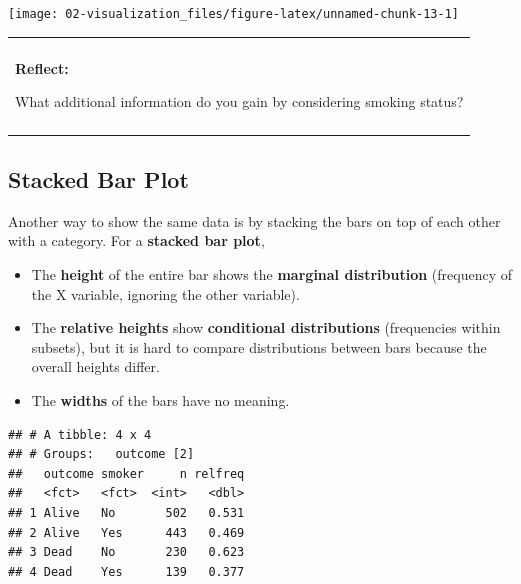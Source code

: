 \documentclass[
]{book}
\newenvironment{Shaded}{\begin{snugshade}}{\end{snugshade}}
\newcommand{\CommentTok}[1]{\textcolor[rgb]{0.56,0.35,0.01}{\textit{#1}}}
\newcommand{\DataTypeTok}[1]{\textcolor[rgb]{0.13,0.29,0.53}{#1}}
\newcommand{\KeywordTok}[1]{\textcolor[rgb]{0.13,0.29,0.53}{\textbf{#1}}}
\newcommand{\NormalTok}[1]{#1}
\newcommand{\OperatorTok}[1]{\textcolor[rgb]{0.81,0.36,0.00}{\textbf{#1}}}
\newcommand{\StringTok}[1]{\textcolor[rgb]{0.31,0.60,0.02}{#1}}
\providecommand{\tightlist}{%
  \setlength{\itemsep}{0pt}\setlength{\parskip}{0pt}}
\newenvironment{reflect}
{
    \begin{center}
    
    \begin{tabular}{|p{0.8\textwidth}|}
    \rowcolor{LightBlue}
    \hline\\
    \rowcolor{LightBlue}
    \textbf{Reflect:}
}
{
    \\\rowcolor{LightBlue}
    \\\hline
    \end{tabular} 
    \end{center}
}
\begin{document}
\begin{center}\texttt{[image: 02-visualization\_files/figure-latex/unnamed-chunk-13-1]} \end{center}

\begin{reflect}
What additional information do you gain by considering smoking status?
\end{reflect}

\hypertarget{stacked-bar-plot}{%
\subsection{Stacked Bar Plot}\label{stacked-bar-plot}}

Another way to show the same data is by stacking the bars on top of each other with a category. For a \textbf{stacked bar plot},

\begin{itemize}
\tightlist
\item
  The \textbf{height} of the entire bar shows the \textbf{marginal distribution} (frequency of the X variable, ignoring the other variable).
\item
  The \textbf{relative heights} show \textbf{conditional distributions} (frequencies within subsets), but it is hard to compare distributions between bars because the overall heights differ.
\item
  The \textbf{widths} of the bars have no meaning.
\end{itemize}

\begin{Shaded}
\end{Shaded}

\begin{verbatim}
## # A tibble: 4 x 4
## # Groups:   outcome [2]
##   outcome smoker     n relfreq
##   <fct>   <fct>  <int>   <dbl>
## 1 Alive   No       502   0.531
## 2 Alive   Yes      443   0.469
## 3 Dead    No       230   0.623
## 4 Dead    Yes      139   0.377
\end{verbatim}
\end{document}
